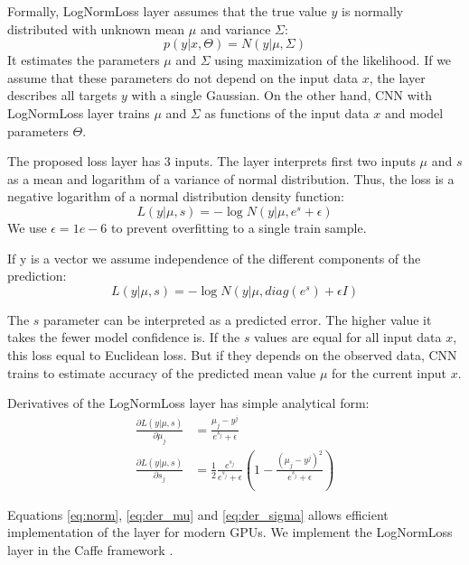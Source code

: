 Formally, LogNormLoss layer assumes that the true value $y$ is normally distributed with unknown mean $\mu$ and variance $\Sigma$:
\begin{equation}
p(y|x, \Theta) = N(y|\mu, \Sigma)
\end{equation}
It estimates the parameters $\mu$ and $\Sigma$ using maximization of the likelihood. If we assume that these parameters do not depend on the input data $x$, the layer describes all targets $y$ with a single Gaussian. On the other hand, CNN with LogNormLoss layer trains $\mu$ and $\Sigma$ as functions of the input data $x$ and model parameters $\Theta$.

The proposed loss layer has 3 inputs. The layer interprets first two inputs $\mu$ and $s$ as a mean and logarithm of a variance of normal distribution. Thus, the loss is a negative logarithm of a normal distribution density function:
\begin{equation}
L(y |\mu, s) = -\log N(y|\mu, e^{s} + \epsilon)
\end{equation}
We use $\epsilon = 1e-6$ to prevent overfitting to a single train sample.

If y is a vector we assume independence of the different components of the prediction:
\begin{equation}
L(y | \mu, s) = -\log N(y|\mu, diag\left(e^{s}\right) + \epsilon I)  \label{eq:norm}
\end{equation}

The $s$ parameter can be interpreted as a predicted error. The higher value it takes the fewer model confidence is. If the $s$ values are equal for all input data $x$, this loss equal to Euclidean loss. But if they depends on the observed data, CNN trains to estimate accuracy of the predicted mean value $\mu$ for the current input $x$.

Derivatives of the LogNormLoss layer has simple analytical form:
\begin{align}
\frac{\partial L(y | \mu, s)}{\partial \mu_j} &= 
\frac{\mu_j - y^j}{e^{s_j} + \epsilon}
\label{eq:der_mu} \\
\frac{\partial L(y | \mu, s)}{\partial s_j} &= 
\frac{1}{2}\frac{e^{s_j}}{e^{s_j} + \epsilon}
\left(1 - \frac{(\mu_j - y^j) ^ 2}{e^{s_j} + \epsilon}\right)  \label{eq:der_sigma}
\end{align}

Equations \eqref{eq:norm}, \eqref{eq:der_mu} and \eqref{eq:der_sigma} allows efficient implementation of the layer for modern GPUs. We implement the LogNormLoss layer in the Caffe framework \cite{jia2014caffe}.

